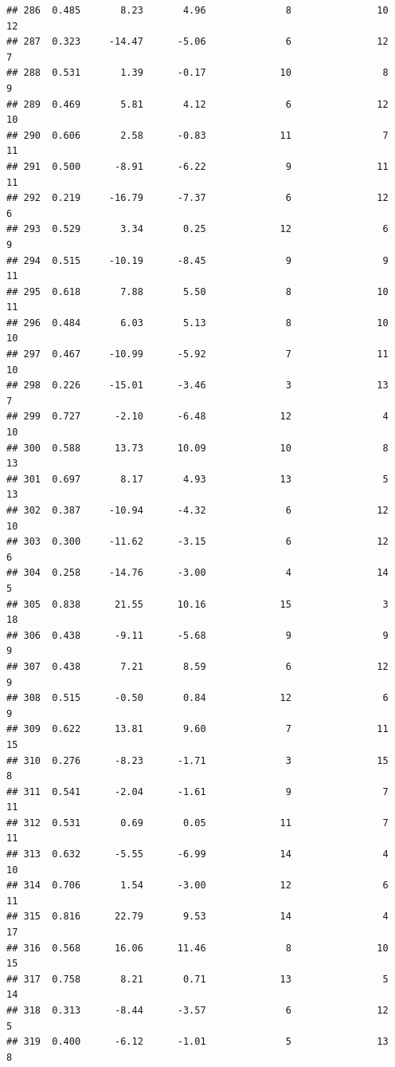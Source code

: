\documentclass[]{book}
\begin{document}
\begin{verbatim}
## 286  0.485       8.23       4.96              8               10       12
## 287  0.323     -14.47      -5.06              6               12        7
## 288  0.531       1.39      -0.17             10                8        9
## 289  0.469       5.81       4.12              6               12       10
## 290  0.606       2.58      -0.83             11                7       11
## 291  0.500      -8.91      -6.22              9               11       11
## 292  0.219     -16.79      -7.37              6               12        6
## 293  0.529       3.34       0.25             12                6        9
## 294  0.515     -10.19      -8.45              9                9       11
## 295  0.618       7.88       5.50              8               10       11
## 296  0.484       6.03       5.13              8               10       10
## 297  0.467     -10.99      -5.92              7               11       10
## 298  0.226     -15.01      -3.46              3               13        7
## 299  0.727      -2.10      -6.48             12                4       10
## 300  0.588      13.73      10.09             10                8       13
## 301  0.697       8.17       4.93             13                5       13
## 302  0.387     -10.94      -4.32              6               12       10
## 303  0.300     -11.62      -3.15              6               12        6
## 304  0.258     -14.76      -3.00              4               14        5
## 305  0.838      21.55      10.16             15                3       18
## 306  0.438      -9.11      -5.68              9                9        9
## 307  0.438       7.21       8.59              6               12        9
## 308  0.515      -0.50       0.84             12                6        9
## 309  0.622      13.81       9.60              7               11       15
## 310  0.276      -8.23      -1.71              3               15        8
## 311  0.541      -2.04      -1.61              9                7       11
## 312  0.531       0.69       0.05             11                7       11
## 313  0.632      -5.55      -6.99             14                4       10
## 314  0.706       1.54      -3.00             12                6       11
## 315  0.816      22.79       9.53             14                4       17
## 316  0.568      16.06      11.46              8               10       15
## 317  0.758       8.21       0.71             13                5       14
## 318  0.313      -8.44      -3.57              6               12        5
## 319  0.400      -6.12      -1.01              5               13        8

\end{verbatim}
\end{document}
